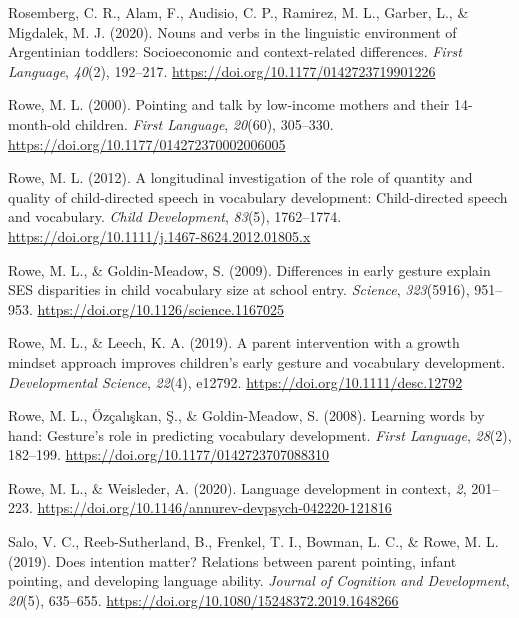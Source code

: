 \documentclass[
  english,
  man,mask]{apa6}
\begin{document}
\leavevmode\hypertarget{ref-rosemberg_nouns_2020}{}%
Rosemberg, C. R., Alam, F., Audisio, C. P., Ramirez, M. L., Garber, L., \& Migdalek, M. J. (2020). Nouns and verbs in the linguistic environment of Argentinian toddlers: Socioeconomic and context-related differences. \emph{First Language}, \emph{40}(2), 192--217. \url{https://doi.org/10.1177/0142723719901226}

\leavevmode\hypertarget{ref-rowe_pointing_2000}{}%
Rowe, M. L. (2000). Pointing and talk by low-income mothers and their 14-month-old children. \emph{First Language}, \emph{20}(60), 305--330. \url{https://doi.org/10.1177/014272370002006005}

\leavevmode\hypertarget{ref-rowe_longitudinal_2012}{}%
Rowe, M. L. (2012). A longitudinal investigation of the role of quantity and quality of child-directed speech in vocabulary development: Child-directed speech and vocabulary. \emph{Child Development}, \emph{83}(5), 1762--1774. \url{https://doi.org/10.1111/j.1467-8624.2012.01805.x}

\leavevmode\hypertarget{ref-rowe_differences_2009}{}%
Rowe, M. L., \& Goldin-Meadow, S. (2009). Differences in early gesture explain SES disparities in child vocabulary size at school entry. \emph{Science}, \emph{323}(5916), 951--953. \url{https://doi.org/10.1126/science.1167025}

\leavevmode\hypertarget{ref-rowe_parent_2019}{}%
Rowe, M. L., \& Leech, K. A. (2019). A parent intervention with a growth mindset approach improves children's early gesture and vocabulary development. \emph{Developmental Science}, \emph{22}(4), e12792. \url{https://doi.org/10.1111/desc.12792}

\leavevmode\hypertarget{ref-rowe_learning_2008}{}%
Rowe, M. L., Özçalışkan, Ş., \& Goldin-Meadow, S. (2008). Learning words by hand: Gesture's role in predicting vocabulary development. \emph{First Language}, \emph{28}(2), 182--199. \url{https://doi.org/10.1177/0142723707088310}

\leavevmode\hypertarget{ref-rowe_language_2020}{}%
Rowe, M. L., \& Weisleder, A. (2020). Language development in context, \emph{2}, 201--223. \url{https://doi.org/10.1146/annurev-devpsych-042220-121816}

\leavevmode\hypertarget{ref-salo_does_2019}{}%
Salo, V. C., Reeb-Sutherland, B., Frenkel, T. I., Bowman, L. C., \& Rowe, M. L. (2019). Does intention matter? Relations between parent pointing, infant pointing, and developing language ability. \emph{Journal of Cognition and Development}, \emph{20}(5), 635--655. \url{https://doi.org/10.1080/15248372.2019.1648266}
\end{document}
